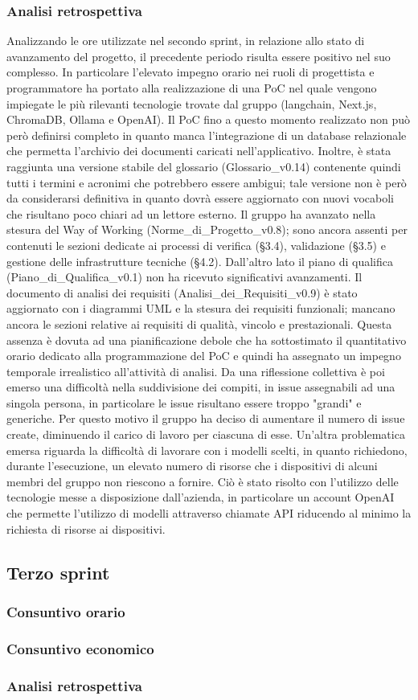 \newpage
\subsubsection{Analisi retrospettiva}
Analizzando le ore utilizzate nel secondo sprint, in relazione allo stato di avanzamento del progetto, il precedente periodo risulta essere positivo nel suo complesso. In particolare l'elevato impegno orario nei ruoli di progettista e programmatore ha portato alla realizzazione di una PoC nel quale vengono impiegate le più rilevanti tecnologie trovate dal gruppo (langchain, Next.js, ChromaDB, Ollama e OpenAI). Il PoC fino a questo momento realizzato non può però definirsi completo in quanto manca l'integrazione di un database relazionale che permetta l'archivio dei documenti caricati nell'applicativo. Inoltre, è stata raggiunta una versione stabile del glossario (Glossario\_v0.14) contenente quindi tutti i termini e acronimi che potrebbero essere ambigui; tale versione non è però da considerarsi definitiva in quanto dovrà essere aggiornato con nuovi vocaboli che risultano poco chiari ad un lettore esterno. Il gruppo ha avanzato nella stesura del Way of Working (Norme\_di\_Progetto\_v0.8); sono ancora assenti per contenuti le sezioni dedicate ai processi di verifica (§3.4),  validazione (§3.5) e gestione delle infrastrutture tecniche (§4.2). Dall'altro lato il piano di qualifica (Piano\_di\_Qualifica\_v0.1) non ha ricevuto significativi avanzamenti. Il documento di analisi dei requisiti (Analisi\_dei\_Requisiti\_v0.9) è stato aggiornato con i diagrammi UML e la stesura dei requisiti funzionali; mancano ancora le sezioni relative ai requisiti di qualità, vincolo e prestazionali. Questa assenza è dovuta ad una pianificazione debole che ha sottostimato il quantitativo orario dedicato alla programmazione del PoC e quindi ha assegnato un impegno temporale irrealistico all'attività di analisi. Da una riflessione collettiva è poi emerso una difficoltà nella suddivisione dei compiti, in issue assegnabili ad una singola persona, in particolare le issue risultano essere troppo "grandi" e generiche. Per questo motivo il gruppo ha deciso di aumentare il numero di issue create, diminuendo il carico di lavoro per ciascuna di esse. Un'altra problematica emersa riguarda la difficoltà di lavorare con i modelli scelti, in quanto richiedono, durante l'esecuzione, un elevato numero di risorse che i dispositivi di alcuni membri del gruppo non riescono a fornire. Ciò è stato risolto con l'utilizzo delle tecnologie messe a disposizione dall'azienda, in particolare un account OpenAI che permette l'utilizzo di modelli attraverso chiamate API riducendo al minimo la richiesta di risorse ai dispositivi.
\newpage

\subsection{Terzo sprint}
\subsubsection{Consuntivo orario}

\subsubsection{Consuntivo economico}

\subsubsection{Analisi retrospettiva}

\newpage
